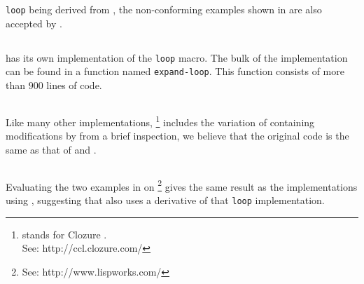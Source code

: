 \sbcl{} \texttt{loop} being derived from \mitloop{}, the
non-conforming examples shown in  are also accepted
by \sbcl{}.

\subsection{\clisp{}}

\clisp{} has its own implementation of the \texttt{loop} macro.  The
bulk of the implementation can be found in a function named
\texttt{expand-loop}.  This function consists of more than $900$ lines
of code.

\subsection{\ccl{}}

Like many other implementations, \ccl{}%
\footnote{\ccl{} stands for Clozure \commonlisp.\\ See:
  http://ccl.clozure.com/} includes the variation of \mitloop{}
containing modifications by \symbolics{} from a brief inspection, we
believe that the original code is the same as that of \sbcl{} and
\ecl{}.

\subsection{\lispworks}

Evaluating the two examples in  on \lispworks{}%
\footnote{See: http://www.lispworks.com/}
gives the same result as the implementations using \mitloop{},
suggesting that \lispworks{} also uses a derivative of that
\texttt{loop} implementation.
